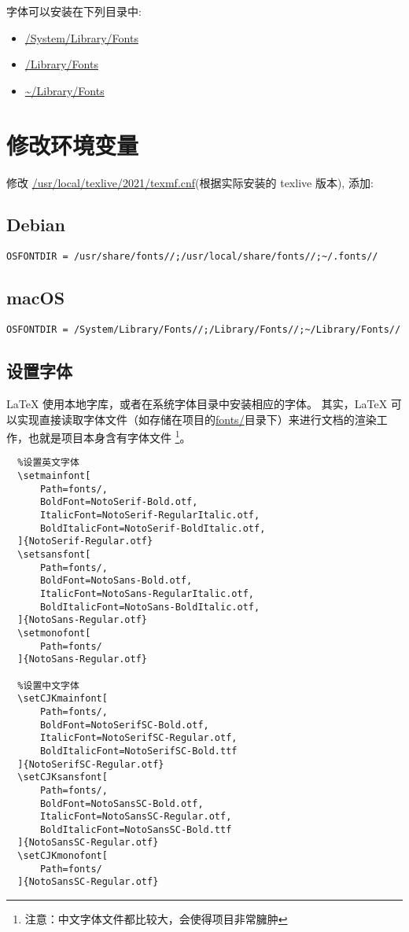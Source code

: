 字体可以安装在下列目录中:

\begin{itemize}
  \item \url{/System/Library/Fonts}
  \item \url{/Library/Fonts}
  \item \url{~/Library/Fonts}
\end{itemize}

\section{修改环境变量 \protect{}}

修改 \url{/usr/local/texlive/2021/texmf.cnf}(根据实际安装的 texlive 版本), 添加:

\subsection{Debian}

\begin{verbatim}
OSFONTDIR = /usr/share/fonts//;/usr/local/share/fonts//;~/.fonts//
\end{verbatim}

\subsection{macOS}

\begin{verbatim}
OSFONTDIR = /System/Library/Fonts//;/Library/Fonts//;~/Library/Fonts//
\end{verbatim}

\subsection{设置字体}

{\LaTeX} 使用本地字库，或者在系统字体目录中安装相应的字体。
其实，{\LaTeX} 可以实现直接读取字体文件（如存储在项目的\url{fonts/}目录下）来进行文档的渲染工作，也就是项目本身含有字体文件
\footnote{注意：中文字体文件都比较大，会使得项目非常臃肿}。

\begin{verbatim}
  %设置英文字体
  \setmainfont[
      Path=fonts/,
      BoldFont=NotoSerif-Bold.otf,
      ItalicFont=NotoSerif-RegularItalic.otf,
      BoldItalicFont=NotoSerif-BoldItalic.otf,
  ]{NotoSerif-Regular.otf}
  \setsansfont[
      Path=fonts/,
      BoldFont=NotoSans-Bold.otf,
      ItalicFont=NotoSans-RegularItalic.otf,
      BoldItalicFont=NotoSans-BoldItalic.otf,
  ]{NotoSans-Regular.otf}
  \setmonofont[
      Path=fonts/
  ]{NotoSans-Regular.otf}
   
  %设置中文字体
  \setCJKmainfont[
      Path=fonts/,
      BoldFont=NotoSerifSC-Bold.otf, 
      ItalicFont=NotoSerifSC-Regular.otf, 
      BoldItalicFont=NotoSerifSC-Bold.ttf
  ]{NotoSerifSC-Regular.otf}
  \setCJKsansfont[
      Path=fonts/,
      BoldFont=NotoSansSC-Bold.otf, 
      ItalicFont=NotoSansSC-Regular.otf, 
      BoldItalicFont=NotoSansSC-Bold.ttf
  ]{NotoSansSC-Regular.otf}
  \setCJKmonofont[
      Path=fonts/
  ]{NotoSansSC-Regular.otf}
\end{verbatim}

